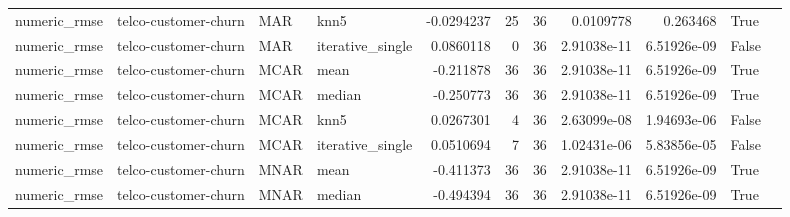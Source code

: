 \begin{table}[ht]
\begin{tabular}{llllrrrrrll}
 numeric\_rmse           & telco-customer-churn & MAR         & knn5             &     -0.0294237   &                  25 &      36 & 0.0109778   & 0.263468    & True               &                                                                                                                    \\
 numeric\_rmse           & telco-customer-churn & MAR         & iterative\_single &      0.0860118   &                   0 &      36 & 2.91038e-11 & 6.51926e-09 & False              &                                                                                                                    \\
 numeric\_rmse           & telco-customer-churn & MCAR        & mean             &     -0.211878    &                  36 &      36 & 2.91038e-11 & 6.51926e-09 & True               &                                                                                                                    \\
 numeric\_rmse           & telco-customer-churn & MCAR        & median           &     -0.250773    &                  36 &      36 & 2.91038e-11 & 6.51926e-09 & True               &                                                                                                                    \\
 numeric\_rmse           & telco-customer-churn & MCAR        & knn5             &      0.0267301   &                   4 &      36 & 2.63099e-08 & 1.94693e-06 & False              &                                                                                                                    \\
 numeric\_rmse           & telco-customer-churn & MCAR        & iterative\_single &      0.0510694   &                   7 &      36 & 1.02431e-06 & 5.83856e-05 & False              &                                                                                                                    \\
 numeric\_rmse           & telco-customer-churn & MNAR        & mean             &     -0.411373    &                  36 &      36 & 2.91038e-11 & 6.51926e-09 & True               &                                                                                                                    \\
 numeric\_rmse           & telco-customer-churn & MNAR        & median           &     -0.494394    &                  36 &      36 & 2.91038e-11 & 6.51926e-09 & True               &                                                                                                                    \\

\end{tabular}
\end{table}

